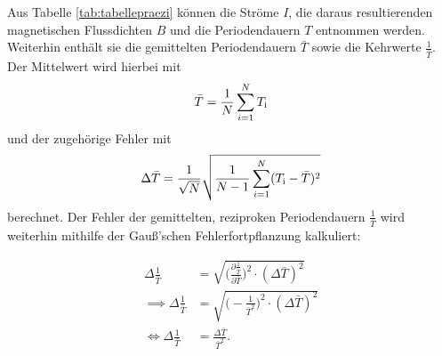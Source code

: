 Aus Tabelle \eqref{tab:tabellepraezi} können die Ströme $I$, die daraus resultierenden magnetischen Flussdichten $B$ und die 
Periodendauern $T$ entnommen werden. Weiterhin enthält sie die gemittelten Periodendauern $\bar{T}$ sowie die 
Kehrwerte $\frac{1}{\bar{T}}$. Der Mittelwert wird hierbei mit
\begin{equation*}
\bar{T} = \frac{1}{N} \sum_{\mathclap{i=1}}^N T_{\text{i}}
\end{equation*}
und der zugehörige Fehler mit
\begin{equation*}
\Delta\bar{T} = \frac{1}{\sqrt{N}} \sqrt{\frac{1}{N-1}\sum_{\mathclap{i=1}}^N (T_{\text{i}}-\bar{T})^2}
\end{equation*}
berechnet.
Der Fehler der gemittelten, reziproken Periodendauern $\frac{1}{\bar{T}}$ wird weiterhin mithilfe der Gauß'schen Fehlerfortpflanzung kalkuliert:

\begin{equation*}
\begin{aligned}
\Delta{\frac{1}{\bar{T}}} &= \sqrt{\biggl(\frac{\partial \frac{1}{\bar{T}}}{\partial \bar{T}}\biggr)^2 \cdot (\Delta \bar{T})^2} \\
\implies \Delta{\frac{1}{\bar{T}}} &= \sqrt{\biggl( - \frac{1}{\bar{T}^2}\biggr)^2 \cdot (\Delta \bar{T})^2} \\
\iff \Delta{\frac{1}{\bar{T}}} &= \frac{\Delta \bar{T}}{\bar{T}^2}. \\
\end{aligned}
\end{equation*}


